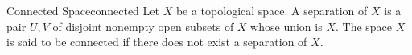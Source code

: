 \begin{definition}{Connected Space}{connected}
Let $X$ be a topological space. A separation of $X$ is a pair $U, V$ of disjoint nonempty open subsets of $X$ whose union is $X$. The space $X$ is said to be connected if there does not exist a separation of $X$.
\end{definition}
